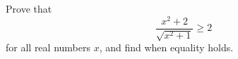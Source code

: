Prove that
\[\dfrac{x^2+2}{\sqrt{x^2+1}}\ge2\]
for all real numbers $x$, and find when equality holds.
